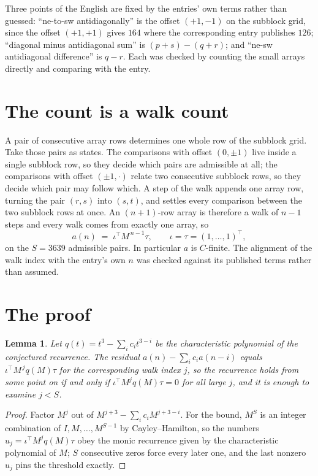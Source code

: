 \documentclass[11pt,a4paper]{article}
\theoremstyle{plain}
\newtheorem{lemma}[theorem]{Lemma}
\theoremstyle{definition}
\begin{document}
Three points of the English are fixed by the entries' own terms rather than guessed:
``ne-to-sw antidiagonally'' is the offset $(+1,-1)$ on the subblock grid, since the offset
$(+1,+1)$ gives $164$ where the corresponding entry publishes $126$; ``diagonal minus
antidiagonal sum'' is $(p+s)-(q+r)$; and ``ne-sw antidiagonal difference'' is $q-r$. Each was
checked by counting the small arrays directly and comparing with the entry.

\section{The count is a walk count}

A pair of consecutive array rows determines one whole row of the subblock grid. Take those
pairs as states. The comparisons with offset $(0,\pm1)$ live inside a single subblock row, so
they decide which pairs are admissible at all; the comparisons with offset $(\pm1,\cdot)$
relate two consecutive subblock rows, so they decide which pair may follow which. A step of the
walk appends one array row, turning the pair $(r,s)$ into $(s,t)$, and settles every comparison
between the two subblock rows at once. An $(n+1)$-row array is therefore a walk of $n-1$ steps
and every walk comes from exactly one array, so
\[
a(n)\;=\;\iota^{\!\top}M^{\,n-1}\tau,\qquad \iota=\tau=(1,\dots,1)^{\!\top},
\]
on the $S=3639$ admissible pairs. In particular $a$ is $C$-finite. The alignment of the walk
index with the entry's own $n$ was checked against its published terms rather than assumed.

\section{The proof}

\begin{lemma}\label{lem:crit}
Let $q(t)=t^{3}-\sum_i c_it^{3-i}$ be the characteristic polynomial of the
conjectured recurrence. The residual $a(n)-\sum_ic_ia(n-i)$ equals
$\iota^{\!\top}M^{\,j}q(M)\tau$ for the corresponding walk index $j$, so the recurrence
holds from some point on if and only if $\iota^{\!\top}M^{j}q(M)\tau=0$ for all large $j$,
and it is enough to examine $j<S$.
\end{lemma}

\begin{proof}
Factor $M^{j}$ out of $M^{j+3}-\sum_ic_iM^{j+3-i}$. For the bound, $M^{S}$
is an integer combination of $I,M,\dots,M^{S-1}$ by Cayley--Hamilton, so the numbers
$u_j=\iota^{\!\top}M^{j}q(M)\tau$ obey the monic recurrence given by the characteristic
polynomial of $M$; $S$ consecutive zeros force every later one, and the last nonzero $u_j$
pins the threshold exactly.
\end{proof}
\end{document}
